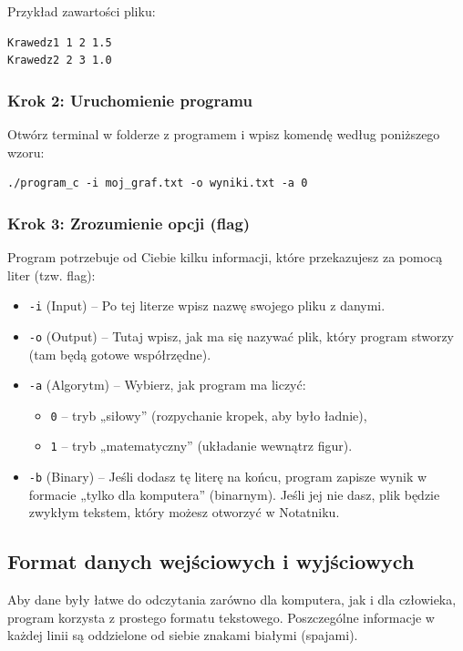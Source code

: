 \documentclass[12pt,a4paper]{article}
\begin{document}
Przykład zawartości pliku:
\begin{verbatim}
Krawedz1 1 2 1.5
Krawedz2 2 3 1.0
\end{verbatim}

\subsubsection{Krok 2: Uruchomienie programu}
Otwórz terminal w folderze z programem i wpisz komendę według poniższego wzoru:
\begin{verbatim}
./program_c -i moj_graf.txt -o wyniki.txt -a 0
\end{verbatim}

\subsubsection{Krok 3: Zrozumienie opcji (flag)}
Program potrzebuje od Ciebie kilku informacji, które przekazujesz za pomocą liter (tzw. flag):
\begin{itemize}
    \item \texttt{-i} (Input) – Po tej literze wpisz nazwę swojego pliku z danymi.
    \item \texttt{-o} (Output) – Tutaj wpisz, jak ma się nazywać plik, który program stworzy (tam będą gotowe współrzędne).
    \item \texttt{-a} (Algorytm) – Wybierz, jak program ma liczyć: 
        \begin{itemize}
            \item \texttt{0} – tryb „siłowy” (rozpychanie kropek, aby było ładnie),
            \item \texttt{1} – tryb „matematyczny” (układanie wewnątrz figur).
        \end{itemize}
    \item \texttt{-b} (Binary) – Jeśli dodasz tę literę na końcu, program zapisze wynik w formacie „tylko dla komputera” (binarnym). Jeśli jej nie dasz, plik będzie zwykłym tekstem, który możesz otworzyć w Notatniku.
\end{itemize}

\subsection{Format danych wejściowych i wyjściowych}
Aby dane były łatwe do odczytania zarówno dla komputera, jak i dla człowieka, program korzysta z prostego formatu tekstowego. Poszczególne informacje w każdej linii są oddzielone od siebie znakami białymi (spajami).
\end{document}
